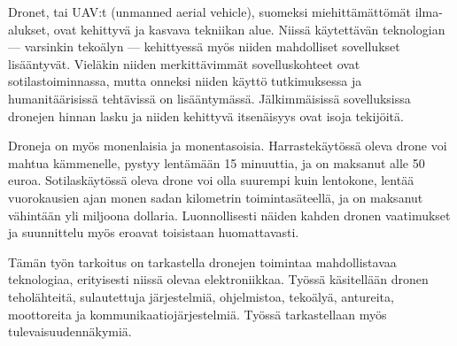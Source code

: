 Dronet, tai UAV:t (unmanned aerial vehicle), suomeksi miehittämättömät
ilma-alukset, ovat kehittyvä ja kasvava tekniikan alue. Niissä käytettävän
teknologian --- varsinkin tekoälyn --- kehittyessä myös niiden mahdolliset
sovellukset lisääntyvät. Vieläkin niiden merkittävimmät sovelluskohteet ovat
sotilastoiminnassa, mutta onneksi niiden käyttö tutkimuksessa ja
humanitäärisissä tehtävissä on lisääntymässä. Jälkimmäisissä sovelluksissa
dronejen hinnan lasku ja niiden kehittyvä itsenäisyys ovat isoja tekijöitä.

Droneja on myös monenlaisia ja monentasoisia. Harrastekäytössä oleva drone voi
mahtua kämmenelle, pystyy lentämään 15 minuuttia, ja on maksanut alle 50 euroa.
Sotilaskäytössä oleva drone voi olla suurempi kuin lentokone, lentää
vuorokausien ajan monen sadan kilometrin toimintasäteellä, ja on maksanut
vähintään yli miljoona dollaria. Luonnollisesti näiden kahden dronen
vaatimukset ja suunnittelu myös eroavat toisistaan huomattavasti.

Tämän työn tarkoitus on tarkastella dronejen toimintaa mahdollistavaa
teknologiaa, erityisesti niissä olevaa elektroniikkaa. Työssä käsitellään
dronen teholähteitä, sulautettuja järjestelmiä, ohjelmistoa, tekoälyä,
antureita, moottoreita ja kommunikaatiojärjestelmiä. Työssä tarkastellaan myös
tulevaisuudennäkymiä.
